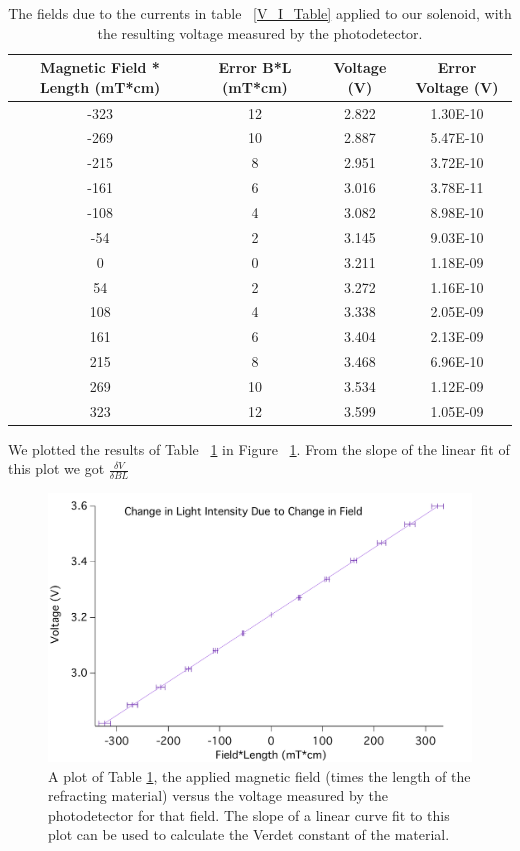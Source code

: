 \documentclass[prb,preprint]{revtex4-1}
\begin{document}
\begin{table}[h!]
\centering
\caption{The fields due to the currents in table ~\ref{V_I_Table} applied to our solenoid, with the resulting voltage measured by the photodetector. }
\begin{ruledtabular}
\begin{tabular}{c c c c}
Magnetic Field * Length (mT*cm) & Error B*L (mT*cm) & Voltage (V) & Error Voltage (V)\\
\hline	%
-323 & 12 & 2.822 & 1.30E-10 \\
-269 & 10 & 2.887 & 5.47E-10 \\
-215 & 8  & 2.951 & 3.72E-10 \\
-161 & 6  & 3.016 & 3.78E-11 \\
-108 & 4  & 3.082 & 8.98E-10 \\
-54  & 2  & 3.145 & 9.03E-10 \\
0    & 0  & 3.211 & 1.18E-09 \\
54   & 2  & 3.272 & 1.16E-10 \\
108  & 4  & 3.338 & 2.05E-09 \\
161  & 6  & 3.404 & 2.13E-09 \\
215  & 8  & 3.468 & 6.96E-10 \\
269  & 10 & 3.534 & 1.12E-09 \\
323  & 12 & 3.599 & 1.05E-09
\end{tabular}
\end{ruledtabular}
\label{V_B*L_Table}
\end{table}

We plotted the results of Table ~\ref{V_B*L_Table} in Figure ~\ref{V_B*L_Plot}. From the slope of the linear fit of this plot we got $\frac{\delta V}{\delta BL}$

\begin{figure}[h!]
\centering
\includegraphics[width=5in]{V_B-L_Plot.pdf}
\caption{A plot of Table \ref{V_B*L_Table}, the applied magnetic field (times the length of the refracting material) versus the voltage measured by the photodetector for that field. The slope of a linear curve fit to this plot can be used to calculate the Verdet constant of the material. }
\label{V_B*L_Plot}
\end{figure}
\end{document}
